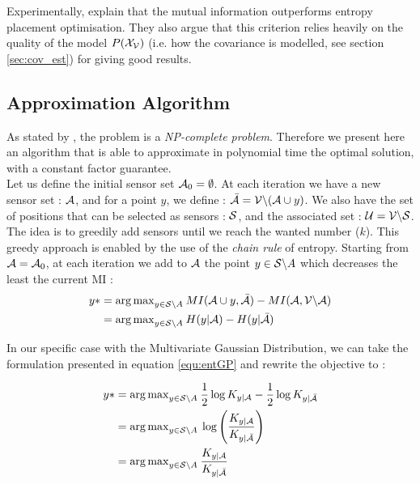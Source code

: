 Experimentally, \citet{krause_near-optimal_2008} explain that  the mutual information outperforms entropy placement optimisation. They also argue that this criterion relies heavily on the quality of the model $P(\X_\V)$ (i.e. how the covariance is modelled, see section \ref{sec:cov_est}) for giving good results. 

\subsection{Approximation Algorithm}
 
 As stated by \citet{krause_near-optimal_2008}, the problem is a \textit{NP-complete problem}. Therefore we present here an algorithm that is able to approximate in polynomial time the optimal solution, with a constant factor guarantee. \\
 
 Let us define the initial sensor set $\A_0 = \emptyset$. At each iteration we have a new sensor set : $\A$,  and for a point $y$, we define : $\bar{\A} = \V \backslash ( \A \cup y )$. We also have the set of positions that can be selected as sensors : $\S$,  and the associated set : $\U = \V \backslash \S $. \\
 
 
 The idea is to greedily add sensors until we reach the wanted number ($k$).   This greedy approach is enabled by the use of the \textit{chain rule} of entropy.  Starting from $\A = \A_0$, at each iteration we add to $\A$ the point $y \in \S \backslash A $ which decreases the least the current MI : 
\begin{align}
    y* &= {\arg \max}_{y \in \S \backslash A } \: MI(\A \cup y, \bar{\A} ) - MI(\A, \VA) \\
    &= {\arg \max}_{y \in \S \backslash A } \: H(y | \A ) - H(y | \bar{\A} )
\end{align}

In our specific case with the Multivariate Gaussian Distribution, we can take the formulation presented in equation \ref{equ:entGP} and rewrite the objective to : 

\begin{align}
    y*  &= {\arg \max}_{y \in \S \backslash A } \: \frac{1}{2} \log K_{y | \A} - \frac{1}{2} \log K_{y | \bar{\A}} \\
    &= {\arg \max}_{y \in \S \backslash A } \: \log \left(\frac{K_{y | \A}}{K_{y | \bar{\A}}} \right) \\
    &= {\arg \max}_{y \in \S \backslash A } \: \frac{K_{y | \A}}{K_{y | \bar{\A}}}
\end{align}

